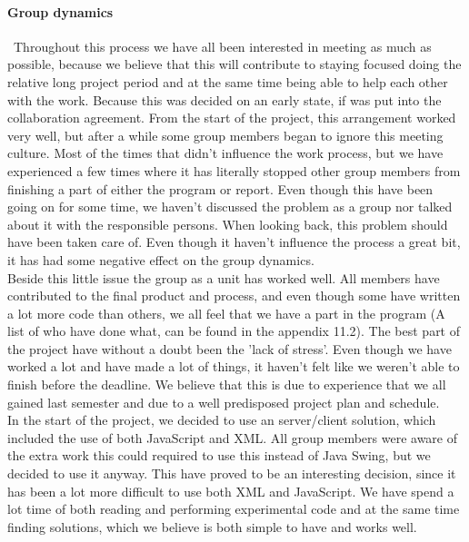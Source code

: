 \documentclass[a4paper,10pt,titlepage]{article}
\begin{document}
		\paragraph{Group dynamics}\mbox{}\
		Throughout this process we have all been interested in meeting as much as possible, because we believe that this will contribute to staying focused doing the relative long project period and at the same time being able to help each other with the work. Because this was decided on an early state, if was put into the collaboration agreement. From the start of the project, this arrangement worked very well, but after a while some group members began to ignore this meeting culture. Most of the times that didn't influence the work process, but we have experienced a few times where it has literally stopped other group members from finishing a part of either the program or report. Even though this have been going on for some time, we haven't discussed the problem as a group nor talked about it with the responsible persons. When looking back, this problem should have been taken care of. Even though it haven't influence the process a great bit, it has had some negative effect on the group dynamics. \\
		Beside this little issue the group as a unit has worked well. All members have contributed to the final product and process, and even though some have written a lot more code than others, we all feel that we have a part in the program (A list of who have done what, can be found  in the appendix 11.2). The best part of the project have without a doubt been the 'lack of stress'. Even though we have worked a lot and have made a lot of things, it haven't felt like we weren't able to finish before the deadline. We believe that this is due to experience that we all gained last semester and due to a well predisposed project plan and schedule. \\


In the start of the project, we decided to use an server/client solution, which included the use of both JavaScript and XML. All group members were aware of the extra work this could required to use this instead of Java Swing, but we decided to use it anyway. This have proved to be an interesting decision, since it has been a lot more difficult to use both XML and JavaScript. We have spend a lot time of both reading and performing experimental code and at the same time finding solutions, which we believe is both simple to have and works well.\\
\end{document}

